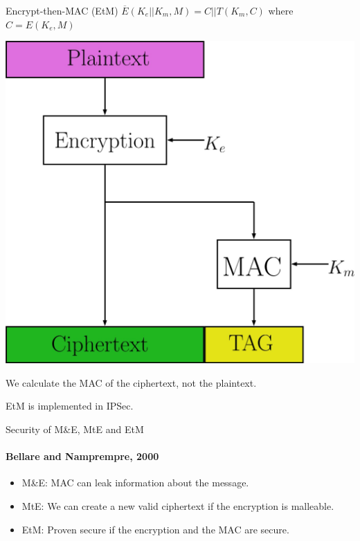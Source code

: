 \documentclass[11pt]{beamer}
\begin{document}
\begin{frame}{Encrypt-then-MAC (EtM)}
$\overline{E}(K_e||K_m, M) = C||T(K_m,C)$ where $C = E(K_e, M)$

\begin{center}
\includegraphics[scale=0.1]{EthenM.jpg}
\end{center}

We calculate the MAC of the ciphertext, not the plaintext.

EtM is implemented in IPSec.
\end{frame}

\begin{frame}{Security of M\&E, MtE and EtM}
\framesubtitle{Bellare and Namprempre, 2000}
\begin{itemize}
	\item M\&E: MAC can leak information about the message.
	\item MtE: We can create a new valid ciphertext if the encryption is malleable.
	\item EtM: Proven secure if the encryption and the MAC are secure.
\end{itemize}
\end{frame}
\end{document}

